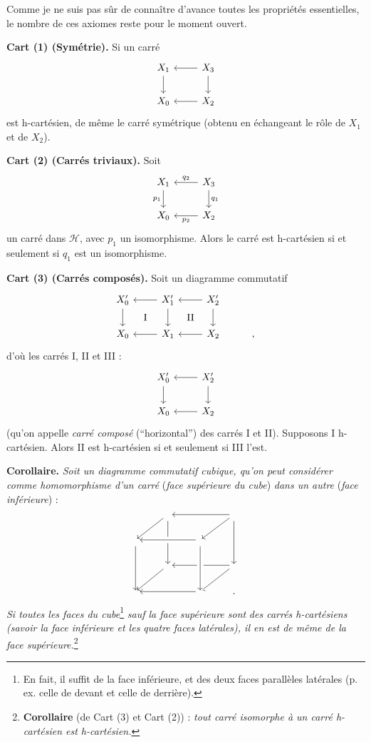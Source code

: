 \noindent Comme je ne suis pas sûr de connaître d'avance toutes les propriétés essentielles, le nombre de ces axiomes reste pour le moment ouvert.

\noindent\textbf{Cart (1) (Symétrie).} Si un carré
\[
\begin{tikzcd}
X_1 \arrow[d] & X_3 \arrow[l] \arrow[d] \\
X_0 & X_2 \arrow[l]
\end{tikzcd}
\]
est h-cartésien, de même le carré symétrique (obtenu en échangeant le rôle de $X_1$ et de $X_2$).

\noindent\textbf{Cart (2) (Carrés triviaux).} Soit
\[
\begin{tikzcd}
X_1 \arrow[d, "p_1"'] & X_3 \arrow[l, "q_2"'] \arrow[d, "q_1"] \\
X_0 & X_2 \arrow[l, "p_2"]
\end{tikzcd}
\]
un carré dans $\mathcal{H}$, avec $p_1$ un isomorphisme. Alors le carré est h-cartésien si et seulement si $q_1$ est un isomorphisme.

\noindent\textbf{Cart (3) (Carrés composés).} Soit un diagramme commutatif
\[
\begin{tikzcd}
X'_0 \arrow[d] \arrow[dr, phantom, "\mathrm{I}"] & X'_1 \arrow[l] \arrow[d] \arrow[dr, phantom, "\mathrm{II}"] & X'_2 \arrow[l] \arrow[d] & \\
X_0 & X_1 \arrow[l] & X_2 \arrow[l] & ,
\end{tikzcd}
\]
d'où les carrés I, II et III :
\[
\begin{tikzcd}
X'_0 \arrow[d] & X'_2 \arrow[l] \arrow[d] \\
X_0 & X_2 \arrow[l]
\end{tikzcd}
\]
(qu'on appelle \textit{carré composé} (“horizontal”) des carrés I et II). Supposons I h-cartésien. Alors II est h-cartésien si et seulement si III l'est.

\noindent\textbf{Corollaire.} \textit{Soit un diagramme commutatif cubique, qu'on peut considérer comme homomorphisme d'un carré} (\textit{face supérieure du cube}) \textit{dans un autre} (\textit{face inférieure}) :
\[
\begin{tikzcd}
 & {} \arrow[dl] \arrow[dd] & & {} \arrow[ll] \arrow[dl] \arrow[dd] \\
{} \arrow[dd] & & {} \arrow[ll, crossing over] & \\
 & {} \arrow[dl] & & {} \arrow[ll] \arrow[dl] \\
{} & & {} \arrow[ll] \arrow[from=uu, crossing over] & .
\end{tikzcd}
\]
\textit{Si toutes les faces du cube}\footnote{En fait, il suffit de la face inférieure, et des deux faces parallèles latérales (p. ex. celle de devant et celle de derrière).} \textit{sauf la face supérieure sont}  \textit{des carrés h-cartésiens (savoir la face inférieure et les quatre faces latérales), il en est de même de la face supérieure.}\footnote{\textbf{Corollaire} (de Cart (3) et Cart (2)) : \textit{tout carré isomorphe à un carré h-cartésien est h-cartésien.}}

